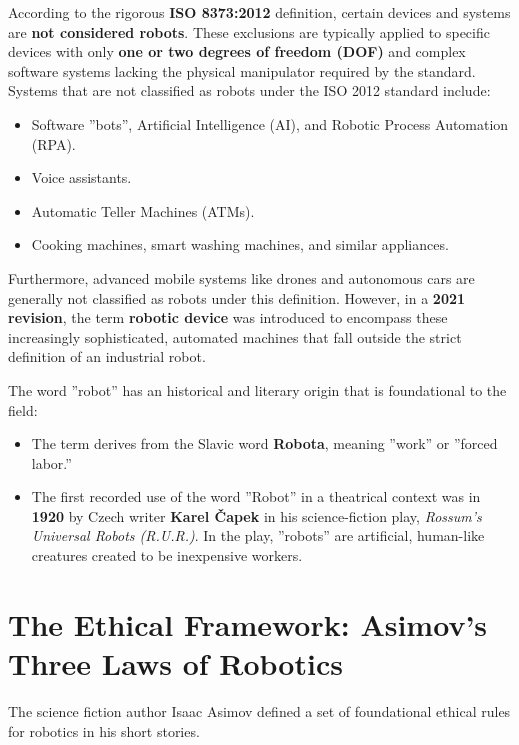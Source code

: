\documentclass[10pt, letterpaper]{report}
\begin{document}
According to the rigorous \textbf{ISO 8373:2012} definition, certain devices and systems are \textbf{not considered robots}. These exclusions are typically applied to specific devices with only \textbf{one or two degrees of freedom (DOF)} and complex software systems lacking the physical manipulator required by the standard.
Systems that are not classified as robots under the ISO 2012 standard include:
\begin{itemize}
    \item Software ''bots'', Artificial Intelligence (AI), and Robotic Process Automation (RPA).
    \item Voice assistants.
    \item Automatic Teller Machines (ATMs).
    \item Cooking machines, smart washing machines, and similar appliances.
\end{itemize}
Furthermore, advanced mobile systems like drones and autonomous cars are generally not classified as robots under this definition. However, in a \textbf{2021 revision}, the term \textbf{robotic device} was introduced to encompass these increasingly sophisticated, automated machines that fall outside the strict definition of an industrial robot.\bigskip


The word ''robot'' has an historical and literary origin that is foundational to the field:
\begin{itemize}
    \item The term derives from the Slavic word \textbf{Robota}, meaning ''work'' or ''forced labor.''
    \item The first recorded use of the word ''Robot'' in a theatrical context was in \textbf{1920} by Czech writer \textbf{Karel Čapek} in his science-fiction play, \textit{Rossum's Universal Robots (R.U.R.)}. In the play, ''robots'' are artificial, human-like creatures created to be inexpensive workers.
\end{itemize}

\section{The Ethical Framework: Asimov's Three Laws of Robotics}\label{gemini:ethical}
The science fiction author Isaac Asimov defined a set of foundational ethical rules for robotics in his short stories.
\end{document}
